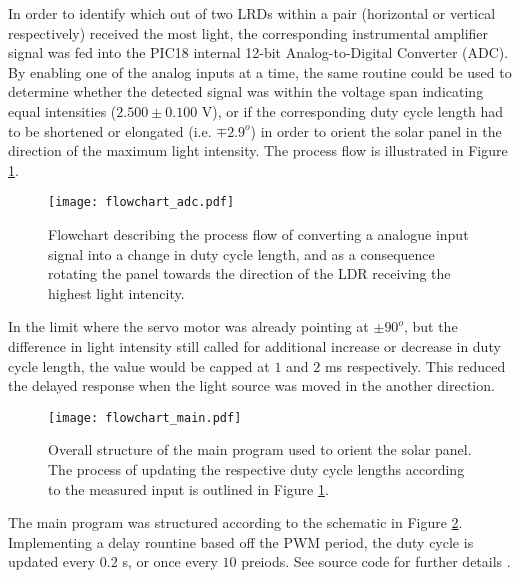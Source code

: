\documentclass[journal]{Imperial_lab_report}
\begin{document}
In order to identify which out of two LRDs within a pair (horizontal or vertical respectively) received the most light, the corresponding instrumental amplifier signal was fed into the PIC18 internal 12-bit Analog-to-Digital Converter (ADC). By enabling one of the analog inputs at a time, the same routine could be used to determine whether the detected signal was within the voltage span indicating equal intensities ($2.500 \pm 0.100$ V), or if the corresponding duty cycle length had to be shortened or elongated (i.e. $\mp 2.9^{o}$) in order to orient the solar panel in the direction of the maximum light intensity. 
The process flow is illustrated in Figure \ref{adc}. 

\begin{figure}[!t]
	\centering
	\texttt{[image: flowchart\_adc.pdf]}
	\caption{Flowchart describing the process flow of converting a analogue input signal into a change in duty cycle length, and as a consequence rotating the panel towards the direction of the LDR receiving the highest light intencity. }
	\label{adc}
\end{figure}

In the limit where the servo motor was already pointing at $\pm 90^{o}$, but the difference in light intensity still called for additional increase or decrease in duty cycle length, the value would be capped at $1$ and $2$ ms respectively. This reduced the delayed response when the light source was moved in the another direction. 

\begin{figure}[!t]
	\centering
	\texttt{[image: flowchart\_main.pdf]}
	\caption{Overall structure of the main program used to orient the solar panel. The process of updating the respective duty cycle lengths according to the measured input is outlined in Figure \ref{adc}.}
	\label{main}
\end{figure}

The main program was structured according to the schematic in Figure \ref{main}. Implementing a delay rountine based off the PWM period, the duty cycle is updated every $0.2$ s, or once every $10$ preiods. See source code for further details \cite{github}. 
\end{document}
